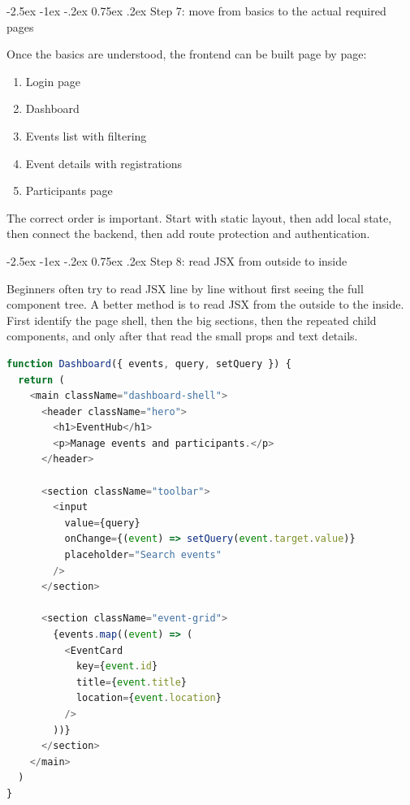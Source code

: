 \documentclass[11pt,a4paper]{article}
\makeatletter
\renewcommand\subsection{\@startsection{subsection}{2}{\z@}%
  {-2.5ex \@plus -1ex \@minus -.2ex}%
  {0.75ex \@plus .2ex}%
  {\normalfont\large\sffamily\bfseries\color{MidnightBlue}}}
\makeatother
\begin{document}
\subsection{Step 7: move from basics to the actual required pages}

Once the basics are understood, the frontend can be built page by page:

\begin{enumerate}
  \item Login page
  \item Dashboard
  \item Events list with filtering
  \item Event details with registrations
  \item Participants page
\end{enumerate}

The correct order is important. Start with static layout, then add local state, then connect the backend, then add route protection and authentication.

\subsection{Step 8: read JSX from outside to inside}

Beginners often try to read JSX line by line without first seeing the full component tree. A better method is to read JSX from the outside to the inside. First identify the page shell, then the big sections, then the repeated child components, and only after that read the small props and text details.

\begin{lstlisting}[style=code, language=JavaScript, caption={A small dashboard read from outside to inside}]
function Dashboard({ events, query, setQuery }) {
  return (
    <main className="dashboard-shell">
      <header className="hero">
        <h1>EventHub</h1>
        <p>Manage events and participants.</p>
      </header>

      <section className="toolbar">
        <input
          value={query}
          onChange={(event) => setQuery(event.target.value)}
          placeholder="Search events"
        />
      </section>

      <section className="event-grid">
        {events.map((event) => (
          <EventCard
            key={event.id}
            title={event.title}
            location={event.location}
          />
        ))}
      </section>
    </main>
  )
}
\end{lstlisting}
\end{document}

